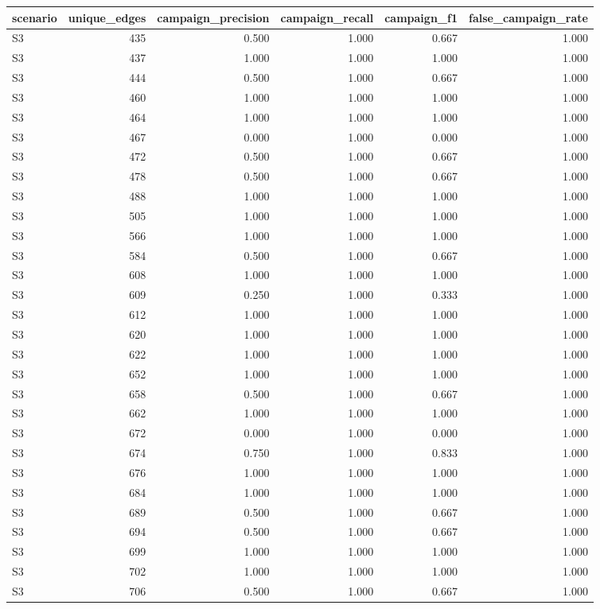 \begin{tabular}{lrrrrr}
\toprule
scenario & unique_edges & campaign_precision & campaign_recall & campaign_f1 & false_campaign_rate \\
\midrule
S3 & 435 & 0.500 & 1.000 & 0.667 & 1.000 \\
S3 & 437 & 1.000 & 1.000 & 1.000 & 1.000 \\
S3 & 444 & 0.500 & 1.000 & 0.667 & 1.000 \\
S3 & 460 & 1.000 & 1.000 & 1.000 & 1.000 \\
S3 & 464 & 1.000 & 1.000 & 1.000 & 1.000 \\
S3 & 467 & 0.000 & 1.000 & 0.000 & 1.000 \\
S3 & 472 & 0.500 & 1.000 & 0.667 & 1.000 \\
S3 & 478 & 0.500 & 1.000 & 0.667 & 1.000 \\
S3 & 488 & 1.000 & 1.000 & 1.000 & 1.000 \\
S3 & 505 & 1.000 & 1.000 & 1.000 & 1.000 \\
S3 & 566 & 1.000 & 1.000 & 1.000 & 1.000 \\
S3 & 584 & 0.500 & 1.000 & 0.667 & 1.000 \\
S3 & 608 & 1.000 & 1.000 & 1.000 & 1.000 \\
S3 & 609 & 0.250 & 1.000 & 0.333 & 1.000 \\
S3 & 612 & 1.000 & 1.000 & 1.000 & 1.000 \\
S3 & 620 & 1.000 & 1.000 & 1.000 & 1.000 \\
S3 & 622 & 1.000 & 1.000 & 1.000 & 1.000 \\
S3 & 652 & 1.000 & 1.000 & 1.000 & 1.000 \\
S3 & 658 & 0.500 & 1.000 & 0.667 & 1.000 \\
S3 & 662 & 1.000 & 1.000 & 1.000 & 1.000 \\
S3 & 672 & 0.000 & 1.000 & 0.000 & 1.000 \\
S3 & 674 & 0.750 & 1.000 & 0.833 & 1.000 \\
S3 & 676 & 1.000 & 1.000 & 1.000 & 1.000 \\
S3 & 684 & 1.000 & 1.000 & 1.000 & 1.000 \\
S3 & 689 & 0.500 & 1.000 & 0.667 & 1.000 \\
S3 & 694 & 0.500 & 1.000 & 0.667 & 1.000 \\
S3 & 699 & 1.000 & 1.000 & 1.000 & 1.000 \\
S3 & 702 & 1.000 & 1.000 & 1.000 & 1.000 \\
S3 & 706 & 0.500 & 1.000 & 0.667 & 1.000 \\

\end{tabular}
